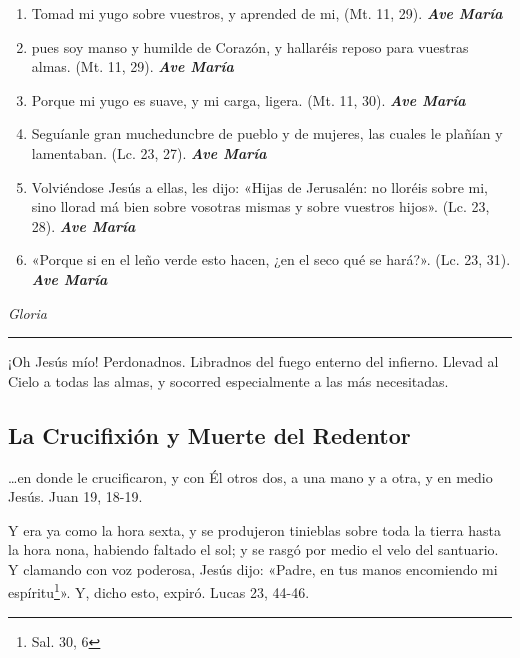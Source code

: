 \documentclass[a4paper,11pt, oneside]{report}
\begin{document}
{{\begin{enumerate}
        \item Tomad mi yugo sobre vuestros, y aprended de mi, (Mt. 11, 29). \textbf{\textit{Ave María}}

        \item pues soy manso y humilde de Corazón, y hallaréis reposo para vuestras almas. (Mt. 11, 29). \textbf{\textit{Ave María}}

        \item Porque mi yugo es suave, y mi carga, ligera. (Mt. 11, 30). \textbf{\textit{Ave María}}

        \item Seguíanle gran mucheduncbre de pueblo y de mujeres, las cuales le plañían y lamentaban. (Lc. 23, 27). \textbf{\textit{Ave María}}

        \item Volviéndose Jesús a ellas, les dijo: «Hijas de Jerusalén: no lloréis sobre mi, sino llorad má bien sobre vosotras mismas y sobre
        vuestros hijos». (Lc. 23, 28). \textbf{\textit{Ave María}}

        \item «Porque si en el leño verde esto hacen, ¿en el seco qué se hará?». (Lc. 23, 31). \textbf{\textit{Ave María}} 

      \end{enumerate}
      
      \indent\textit{Gloria} \par      

      \begin{center}\rule{1\linewidth}{\linethickness}\end{center}      
      
      \medskip
      \hypertarget{finalCruz}{¡Oh Jesús mío! Perdonadnos. Libradnos del fuego enterno del infierno. Llevad al Cielo a todas las almas, y socorred especialmente a las más 
      necesitadas.}
    }
  
  \subsection*{La Crucifixión y Muerte del Redentor}
    {
      {\ldots}en donde le crucificaron, y con Él otros dos, a una mano y a otra, y en medio Jesús. Juan 19, 18-19.

      \smallskip
      Y era ya como la hora sexta, y se produjeron tinieblas sobre toda la tierra hasta la hora nona, habiendo faltado el sol; y se rasgó por medio 
      el velo del santuario. Y clamando con voz poderosa, Jesús dijo: «Padre, en tus manos encomiendo mi espíritu\footnote{Sal. 30, 6}». 
      Y, dicho esto, expiró. Lucas 23, 44-46.
      
}}
\end{document}
